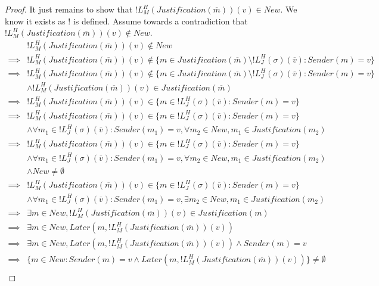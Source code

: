 \begin{proof}
It just remains to show that $!L^H_M(Justification(\overline{m}))(v) \in New$. We know it exists as ! is defined. Assume towards a contradiction that $!L^H_M(Justification(\overline{m}))(v) \notin New$.
\begin{align}
          &!L^H_M(Justification(\overline{m}))(v) \notin New \\
  \implies&!L^H_M(Justification(\overline{m}))(v) \notin \{ m \in Justification(\overline{m}) \setminus !L^H_J(\sigma)(\overline{v}): Sender(m) = v \} \\
  \implies&!L^H_M(Justification(\overline{m}))(v) \notin \{ m \in Justification(\overline{m}) \setminus !L^H_J(\sigma)(\overline{v}): Sender(m) = v \} \\
          &\land !L^H_M(Justification(\overline{m}))(v) \in Justification(\overline{m}) \\
  \implies&!L^H_M(Justification(\overline{m}))(v) \in \{ m \in !L^H_J(\sigma)(\overline{v}): Sender(m) = v \} \\
  \implies&!L^H_M(Justification(\overline{m}))(v) \in \{ m \in !L^H_J(\sigma)(\overline{v}): Sender(m) = v \} \\
          &\land \forall m_1 \in !L^H_J(\sigma)(\overline{v}) : Sender(m_1) = v, \forall m_2 \in New, m_1 \in Justification(m_2) \\
  \implies&!L^H_M(Justification(\overline{m}))(v) \in \{ m \in !L^H_J(\sigma)(\overline{v}): Sender(m) = v \} \\
          &\land \forall m_1 \in !L^H_J(\sigma)(\overline{v}) : Sender(m_1) = v, \forall m_2 \in New, m_1 \in Justification(m_2) \\
          &\land New \neq \emptyset \\
  \implies&!L^H_M(Justification(\overline{m}))(v) \in \{ m \in !L^H_J(\sigma)(\overline{v}): Sender(m) = v \} \\
          &\land \forall m_1 \in !L^H_J(\sigma)(\overline{v}) : Sender(m_1) = v, \exists m_2 \in New, m_1 \in Justification(m_2) \\
  \implies&\exists m \in New, !L^H_M(Justification(\overline{m}))(v) \in Justification(m) \\
  \implies&\exists m \in New, Later(m, !L^H_M(Justification(\overline{m}))(v)) \\
  \implies&\exists m \in New, Later(m, !L^H_M(Justification(\overline{m}))(v)) \land Sender(m) = v \\
  \implies&\{m \in New : Sender(m) = v \land Later(m, !L^H_M(Justification(\overline{m}))(v))\} \neq \emptyset \\

\end{align}
\end{proof}
